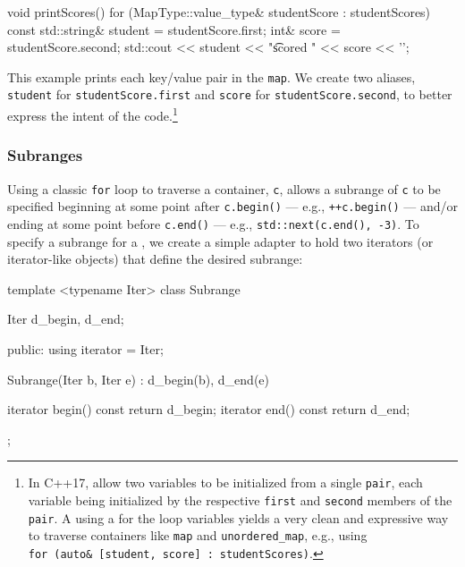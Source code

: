 {{\begin{emcppslisting}
void printScores()
{
    for (MapType::value_type& studentScore : studentScores)
    {
        const std::string& student = studentScore.first;
        int&               score   = studentScore.second;
        std::cout << student << "\t scored " << score << '\n';
    }
}
\end{emcppslisting}
    

\noindent This example prints each key/value pair in the \lstinline!map!. We create
two aliases, \lstinline!student! for \lstinline!studentScore.first! and
\lstinline!score! for \lstinline!studentScore.second!, to better express the
intent of the code.{\cprotect\footnote{In C++17,  allow two variables to be initialized from a single
\lstinline!pair!, each variable being initialized by the respective
\lstinline!first! and \lstinline!second! members of the \lstinline!pair!. A
 using a  for the loop variables yields a very clean and expressive way
to traverse containers like \lstinline!map! and \lstinline!unordered_map!,
e.g., using
  \lstinline!for!~\lstinline!(auto&!~\lstinline![student,!~\lstinline!score]!~\lstinline!:!~\lstinline!studentScores)!.}}

\subsubsection[Subranges]{Subranges}\label{subranges}

Using a classic \lstinline!for! loop to traverse a container, \lstinline!c!,
allows a subrange of \lstinline!c! to be specified beginning at some point
after \lstinline!c.begin()! --- e.g., \lstinline!++c.begin()! --- and/or ending at
some point before \lstinline!c.end()! --- e.g.,
\lstinline!std::next(c.end(),!~\lstinline!-3)!. To specify a subrange for a
, we create a simple adapter to
hold two iterators (or iterator-like objects) that define the desired
subrange:

\begin{emcppslisting}[emcppsbatch=e2]
template <typename Iter>
class Subrange
{
    Iter d_begin, d_end;

public:
    using iterator = Iter;

    Subrange(Iter b, Iter e) : d_begin(b), d_end(e) { }

    iterator begin() const { return d_begin; }
    iterator end()   const { return d_end;   }
};


\end{emcppslisting}}}
